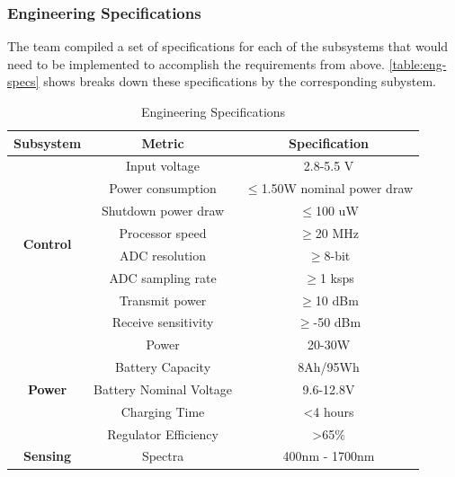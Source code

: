 \subsubsection{Engineering Specifications}
The team compiled a set of specifications for each of the subsystems that would need to be implemented to accomplish the requirements from above. \autoref{table:eng-specs} shows breaks down these specifications by the corresponding subystem.
\begin{table}[H]
    \caption{Engineering Specifications}
    \centering
    \begin{tabular}{c|c|c}
        \hline
        \textbf{Subsystem} & \textbf{Metric} & \textbf{Specification} \\\cline{2-3}
        \hline
        \multirow{8}{*}{\textbf{Control}} & Input voltage & 2.8-5.5 V \\ \cline{2-3}
                                        & Power consumption & $\leq$1.50W nominal power draw \\ \cline{2-3}
                                        & Shutdown power draw   & $\leq$100 uW \\ \cline{2-3}
                                        & Processor speed       & $\geq$20 MHz \\ \cline{2-3}
                                        & ADC resolution        & $\geq$8-bit \\ \cline{2-3}
                                        & ADC sampling rate     & $\geq$1 ksps \\ \cline{2-3}
                                        & Transmit power        & $\geq$10 dBm \\ \cline{2-3}
                                        & Receive sensitivity   & $\geq$-50 dBm \\ \cline{2-3}
        \hline
        \multirow{5}{*}{\textbf{Power}} & Power & 20-30W \\\cline{2-3}
                                        & Battery Capacity & 8Ah/95Wh \\\cline{2-3}
                                        & Battery Nominal Voltage & 9.6-12.8V \\\cline{2-3}
                                        & Charging Time & \textless4 hours \\\cline{2-3}
                                        & Regulator Efficiency & \textgreater65\% \\\cline{2-3}
        \hline
        \multirow{3}{*}{\textbf{Sensing}} & Spectra & 400nm - 1700nm \\\cline{2-3}

\end{tabular}
\end{table}

